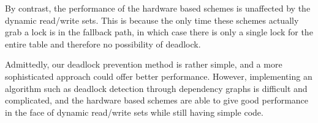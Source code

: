 By contrast, the performance of the hardware based schemes is unaffected by 
the dynamic read/write sets. This is because the only time these schemes 
actually grab a lock is in the fallback path, in which case there is only a 
single lock for the entire table and therefore no possibility of deadlock.

Admittedly, our deadlock prevention method is rather simple, and a more 
sophisticated approach could offer better performance. However, implementing 
an algorithm such as deadlock detection through dependency graphs is difficult 
and complicated, and the hardware based schemes are able to give good 
performance in the face of dynamic read/write sets while still having 
simple code.


